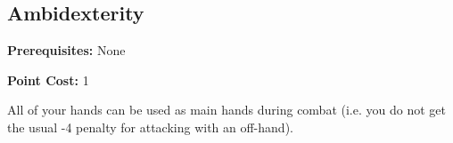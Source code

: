 \subsection*{Ambidexterity}\label{feat:ambidexterity}

\noindent
\textbf{Prerequisites:} None

\noindent
\textbf{Point Cost:} 1 

All of your hands can be used as main hands during combat (i.e. you do not
get the usual -4 penalty for attacking with an off-hand).
